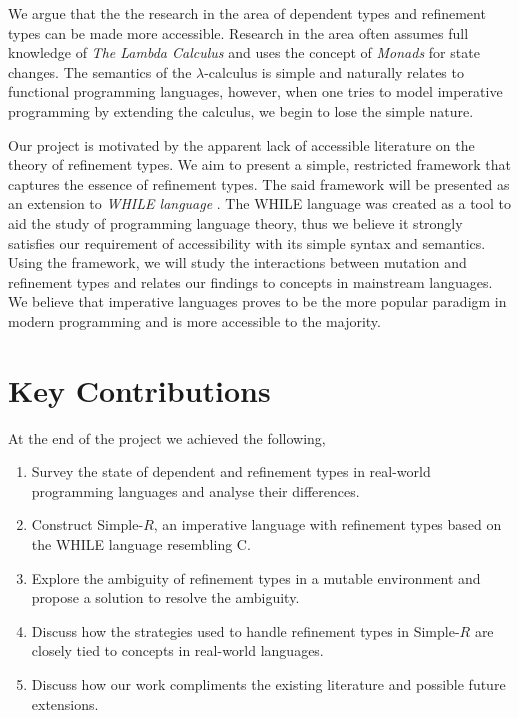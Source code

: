\documentclass[a4paper,12pt]{report}
\begin{document}
\par
We argue that the the research in the area of dependent types and refinement 
types can be made more accessible. Research in the area often assumes full 
knowledge of \textit{The Lambda Calculus} \cite{lambdaCalculus} and uses 
the concept of \textit{Monads} \cite{monads} for state changes. The semantics 
of the $\lambda$-calculus is simple and naturally 
relates to functional programming languages, however, when one tries to model 
imperative programming by extending the calculus, we begin to lose the simple 
nature. 

\par
Our project is motivated by the apparent lack of accessible literature on the 
theory of refinement types. We aim to present a simple, restricted framework that 
captures the essence of refinement types. The said framework will be presented as 
an extension to \textit{WHILE language} \cite{whileLanguage}. The WHILE language was 
created as a tool to aid the study of programming language theory, 
thus we believe it strongly satisfies our requirement of accessibility with 
its simple syntax and semantics. Using the 
framework, we will study the interactions between mutation and refinement types 
and relates our findings to concepts in mainstream languages. We believe that 
imperative languages proves to be the more popular paradigm in modern 
programming and is more accessible to the majority. 


\section{Key Contributions}
At the end of the project we achieved the following, 
\begin{enumerate}
  \item Survey the state of dependent and refinement types in 
  real-world programming languages and analyse their differences.
  \item Construct Simple-$R$, an imperative language with refinement types 
  based on the WHILE language resembling C. 
  \item Explore the ambiguity of refinement types in a mutable environment 
  and propose a solution to resolve the ambiguity.
  \item Discuss how the strategies used to handle refinement types in 
  Simple-$R$ are closely tied to concepts in real-world languages.  
  \item Discuss how our work compliments the existing literature and possible 
  future extensions.
\end{enumerate}
\end{document}
